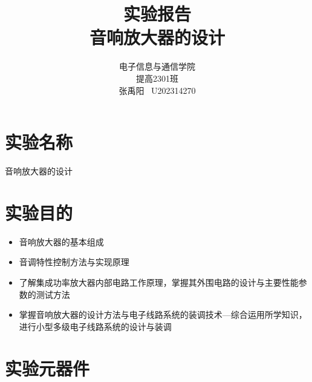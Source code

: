 \documentclass[a4paper,11pt,UTF8]{article}
\numberwithin{equation}{subsection}
\begin{document}
\title{\huge 实验报告 \\ 音响放大器的设计}
\author{电子信息与通信学院 \\ 提高2301班 \\ 张禹阳 \ U202314270}

\maketitle

\begin{figure}[H]
	\centering
\end{figure}

\tableofcontents\newpage

\section{实验名称}
音响放大器的设计
\section{实验目的}
\begin{itemize}
	\item 音响放大器的基本组成
	\item 音调特性控制方法与实现原理
	\item 了解集成功率放大器内部电路工作原理，掌握其外围电路的设计与主要性能参数的测试方法
	\item 掌握音响放大器的设计方法与电子线路系统的装调技术---综合运用所学知识，进行小型多级电子线路系统的设计与装调
\end{itemize}
\section{实验元器件}
\end{document}
